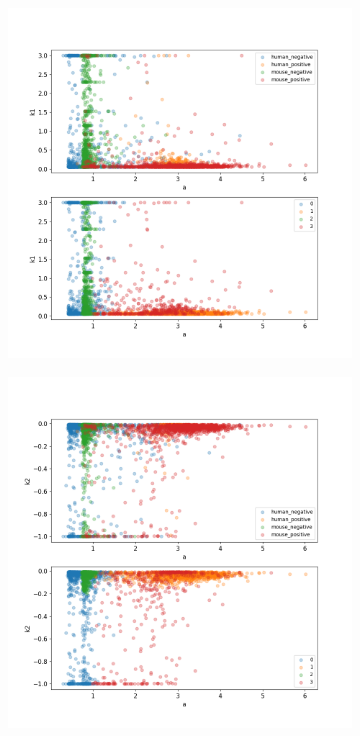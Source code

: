 \begin{figure}
\begin{subfigure}{0.45\textwidth}
	\end{subfigure}
	\hfill
	\begin{subfigure}{0.45\textwidth}
		\includegraphics[width=\textwidth]{fig/seperate_a_k1}
	\end{subfigure}
	\hfill
	\begin{subfigure}{0.45\textwidth}
		\includegraphics[width=\textwidth]{fig/seperate_a_k2}

\end{subfigure}
\end{figure}
